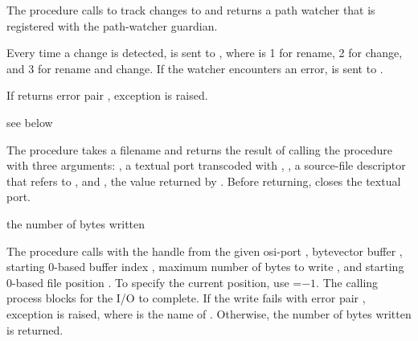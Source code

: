 The  procedure calls  to track
changes to  and returns a path watcher that is registered
with the path-watcher guardian.

Every time a change is detected,  is sent to , where
 is 1 for rename, 2 for change, and 3 for rename and
change. If the watcher encounters an error,
 is sent to
.

If  returns error pair , exception  is raised.

\begin{procedure}
\end{procedure}
\returns{} see below

The  procedure takes a filename
 and returns the result of calling the procedure
 with three arguments: , a textual port
transcoded with , , a
source-file descriptor that refers to , and
, the value returned by .
Before returning,  closes the textual
port.

\begin{procedure}
\end{procedure}
\returns{} the number of bytes written

The  procedure calls  with
the handle from the given osi-port , bytevector buffer
, starting 0-based buffer index , maximum number of
bytes to write , and starting 0-based file position
. To specify the current position, use =$-1$. The
calling process blocks for the I/O to complete. If the write fails
with error pair , exception
 is raised, where
 is the name of . Otherwise, the number of bytes
written is returned.

